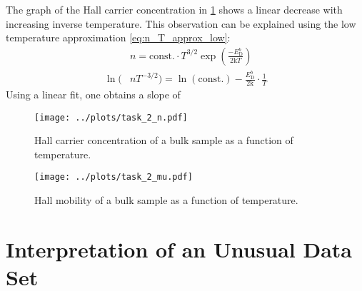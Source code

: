The graph of the Hall carrier concentration in \cref{fig:zno_hall_effect_n} shows a linear decrease with increasing inverse temperature. 
This observation can be explained using the low temperature approximation \cref{eq:n_T_approx_low}:
\begin{align}
	&n = \text{const.} \cdot T^{3/2} \exp\left( \frac{-E_{\mathrm{D}}^{b}}{2 \mathrm{k}T} \right) \\
	\ln(&n T^{-3/2}) = \ln(\text{const.}) - \frac{E_{\mathrm{D}}^{b}}{2 \mathrm{k}} \cdot \frac{1}{T}
\end{align}
Using a linear fit, one obtains a slope of 

\begin{figure}
	\centering
	\texttt{[image: ../plots/task\_2\_n.pdf]}
	\caption{Hall carrier concentration of a bulk  sample as a function of temperature.}
	\label{fig:zno_hall_effect_n}
\end{figure}
\begin{figure}
	\centering
	\texttt{[image: ../plots/task\_2\_mu.pdf]}
	\caption{Hall mobility of a bulk  sample as a function of temperature.}
	\label{fig:zno_hall_effect_mu}
\end{figure}

\section{Interpretation of an Unusual Data Set}